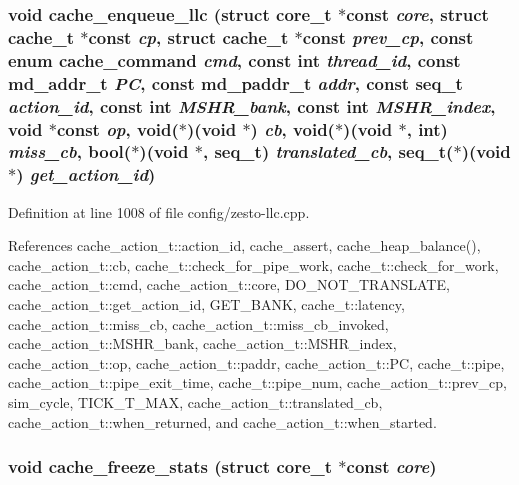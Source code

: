 \subsubsection[{cache\_\-enqueue\_\-llc}]{\setlength{\rightskip}{0pt plus 5cm}void cache\_\-enqueue\_\-llc (struct {\bf core\_\-t} $\ast$const  {\em core}, \/  struct {\bf cache\_\-t} $\ast$const  {\em cp}, \/  struct {\bf cache\_\-t} $\ast$const  {\em prev\_\-cp}, \/  const enum {\bf cache\_\-command} {\em cmd}, \/  const int {\em thread\_\-id}, \/  const {\bf md\_\-addr\_\-t} {\em PC}, \/  const {\bf md\_\-paddr\_\-t} {\em addr}, \/  const {\bf seq\_\-t} {\em action\_\-id}, \/  const int {\em MSHR\_\-bank}, \/  const int {\em MSHR\_\-index}, \/  void $\ast$const  {\em op}, \/  void($\ast$)(void $\ast$) {\em cb}, \/  void($\ast$)(void $\ast$, int) {\em miss\_\-cb}, \/  bool($\ast$)(void $\ast$, {\bf seq\_\-t}) {\em translated\_\-cb}, \/  {\bf seq\_\-t}($\ast$)(void $\ast$) {\em get\_\-action\_\-id})}\label{zesto-cache_8h_6955e78ccb0fb1511754e8cd113e1dcc}




Definition at line 1008 of file config/zesto-llc.cpp.

References cache\_\-action\_\-t::action\_\-id, cache\_\-assert, cache\_\-heap\_\-balance(), cache\_\-action\_\-t::cb, cache\_\-t::check\_\-for\_\-pipe\_\-work, cache\_\-t::check\_\-for\_\-work, cache\_\-action\_\-t::cmd, cache\_\-action\_\-t::core, DO\_\-NOT\_\-TRANSLATE, cache\_\-action\_\-t::get\_\-action\_\-id, GET\_\-BANK, cache\_\-t::latency, cache\_\-action\_\-t::miss\_\-cb, cache\_\-action\_\-t::miss\_\-cb\_\-invoked, cache\_\-action\_\-t::MSHR\_\-bank, cache\_\-action\_\-t::MSHR\_\-index, cache\_\-action\_\-t::op, cache\_\-action\_\-t::paddr, cache\_\-action\_\-t::PC, cache\_\-t::pipe, cache\_\-action\_\-t::pipe\_\-exit\_\-time, cache\_\-t::pipe\_\-num, cache\_\-action\_\-t::prev\_\-cp, sim\_\-cycle, TICK\_\-T\_\-MAX, cache\_\-action\_\-t::translated\_\-cb, cache\_\-action\_\-t::when\_\-returned, and cache\_\-action\_\-t::when\_\-started.
\subsubsection[{cache\_\-freeze\_\-stats}]{\setlength{\rightskip}{0pt plus 5cm}void cache\_\-freeze\_\-stats (struct {\bf core\_\-t} $\ast$const  {\em core})}\label{zesto-cache_8h_bd1fe8334f2259dc773b85f98c7fbcfa}




